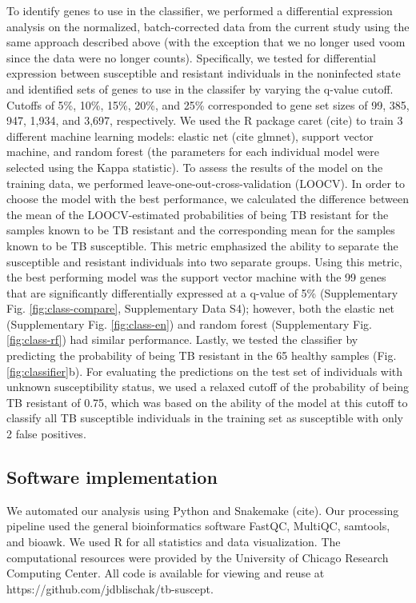 \documentclass[fleqn,10pt]{wlscirep}
\begin{document}
To identify genes to use in the classifier, we performed a
differential expression analysis on the normalized, batch-corrected
data from the current study using the same approach described above
(with the exception that we no longer used voom since the data were no
longer counts). Specifically, we tested for differential expression
between susceptible and resistant individuals in the noninfected state
and identified sets of genes to use in the classifer by varying the
q-value cutoff. Cutoffs of 5\%, 10\%, 15\%, 20\%, and 25\%
corresponded to gene set sizes of 99, 385, 947, 1,934, and 3,697,
respectively. We used the R package caret (cite) to train 3 different
machine learning models: elastic net (cite glmnet), support vector
machine, and random forest (the parameters for each individual model
were selected using the Kappa statistic). To assess the results of the
model on the training data, we performed
leave-one-out-cross-validation (LOOCV). In order to choose the model
with the best performance, we calculated the difference between the
mean of the LOOCV-estimated probabilities of being TB resistant for
the samples known to be TB resistant and the corresponding mean for
the samples known to be TB susceptible. This metric emphasized the
ability to separate the susceptible and resistant individuals into two
separate groups. Using this metric, the best performing model was the
support vector machine with the 99 genes that are significantly
differentially expressed at a q-value of 5\% (Supplementary Fig.
\ref{fig:class-compare}, Supplementary Data S4); however, both the
elastic net (Supplementary Fig. \ref{fig:class-en}) and random forest
(Supplementary Fig. \ref{fig:class-rf}) had similar performance.
Lastly, we tested the classifier by predicting the probability of
being TB resistant in the 65 healthy samples (Fig.
\ref{fig:classifier}b). For evaluating the predictions on the test set
of individuals with unknown susceptibility status, we used a relaxed
cutoff of the probability of being TB resistant of 0.75, which was
based on the ability of the model at this cutoff to classify all TB
susceptible individuals in the training set as susceptible with only 2
false positives.
\subsection*{Software implementation}

We automated our analysis using Python and Snakemake (cite). Our
processing pipeline used the general bioinformatics software FastQC,
MultiQC, samtools, and bioawk. We used R for all statistics and data
visualization. The computational resources were provided by the
University of Chicago Research Computing Center. All code is available
for viewing and reuse at https://github.com/jdblischak/tb-suscept.
\end{document}
